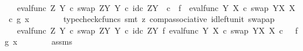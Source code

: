 \begin{isabellebody}
\ \ \ \ \isamarkupfalse%
\ \isamarkupfalse%
\ {\isachardoublequoteopen}{\isachardot}{\kern0pt}{\isachardot}{\kern0pt}{\isachardot}{\kern0pt}\ {\isacharequal}{\kern0pt}\ {\isacharparenleft}{\kern0pt}eval{\isacharunderscore}{\kern0pt}func\ Z\ Y\ {\isasymcirc}\isactrlsub c\ swap\ {\isacharparenleft}{\kern0pt}Z\isactrlbsup Y\isactrlesup {\isacharparenright}{\kern0pt}\ Y{\isacharparenright}{\kern0pt}\ {\isasymcirc}\isactrlsub c\ {\isasymlangle}id\isactrlsub c\ {\isacharparenleft}{\kern0pt}Z\isactrlbsup Y\isactrlesup {\isacharparenright}{\kern0pt}\ \ {\isasymcirc}\isactrlsub c\ \ f\ {\isacharcomma}{\kern0pt}\ {\isacharparenleft}{\kern0pt}eval{\isacharunderscore}{\kern0pt}func\ Y\ X\ {\isasymcirc}\isactrlsub c\ swap\ {\isacharparenleft}{\kern0pt}Y\isactrlbsup X\isactrlesup {\isacharparenright}{\kern0pt}\ X{\isacharparenright}{\kern0pt}\ \ {\isasymcirc}\isactrlsub c\ {\isasymlangle}g{\isacharcomma}{\kern0pt}\ x{\isasymrangle}{\isasymrangle}{\isachardoublequoteclose}\isanewline
\ \ \ \ \ \ \isamarkupfalse%
\ {\isacharparenleft}{\kern0pt}typecheck{\isacharunderscore}{\kern0pt}cfuncs{\isacharcomma}{\kern0pt}\ smt\ {\isacharparenleft}{\kern0pt}z{}{\isacharparenright}{\kern0pt}\ comp{\isacharunderscore}{\kern0pt}associative{}\ id{\isacharunderscore}{\kern0pt}left{\isacharunderscore}{\kern0pt}unit{}\ swap{\isacharunderscore}{\kern0pt}ap{\isacharparenright}{\kern0pt}\isanewline
\ \ \ \ \isamarkupfalse%
\ \isamarkupfalse%
\ {\isachardoublequoteopen}{\isachardot}{\kern0pt}{\isachardot}{\kern0pt}{\isachardot}{\kern0pt}\ {\isacharequal}{\kern0pt}\ {\isacharparenleft}{\kern0pt}eval{\isacharunderscore}{\kern0pt}func\ Z\ Y\ {\isasymcirc}\isactrlsub c\ swap\ {\isacharparenleft}{\kern0pt}Z\isactrlbsup Y\isactrlesup {\isacharparenright}{\kern0pt}\ Y{\isacharparenright}{\kern0pt}\ {\isasymcirc}\isactrlsub c\ {\isacharparenleft}{\kern0pt}id\isactrlsub c\ {\isacharparenleft}{\kern0pt}Z\isactrlbsup Y\isactrlesup {\isacharparenright}{\kern0pt}\ {\isasymtimes}\isactrlsub f\ {\isacharparenleft}{\kern0pt}eval{\isacharunderscore}{\kern0pt}func\ Y\ X\ {\isasymcirc}\isactrlsub c\ swap\ {\isacharparenleft}{\kern0pt}Y\isactrlbsup X\isactrlesup {\isacharparenright}{\kern0pt}\ X{\isacharparenright}{\kern0pt}{\isacharparenright}{\kern0pt}\ {\isasymcirc}\isactrlsub c\ \ \ {\isasymlangle}f{\isacharcomma}{\kern0pt}{\isasymlangle}g{\isacharcomma}{\kern0pt}\ x{\isasymrangle}{\isasymrangle}{\isachardoublequoteclose}\isanewline
\ \ \ \ \ \ \isamarkupfalse%
\ assms\ \isamarkupfalse%

\end{isabellebody}

